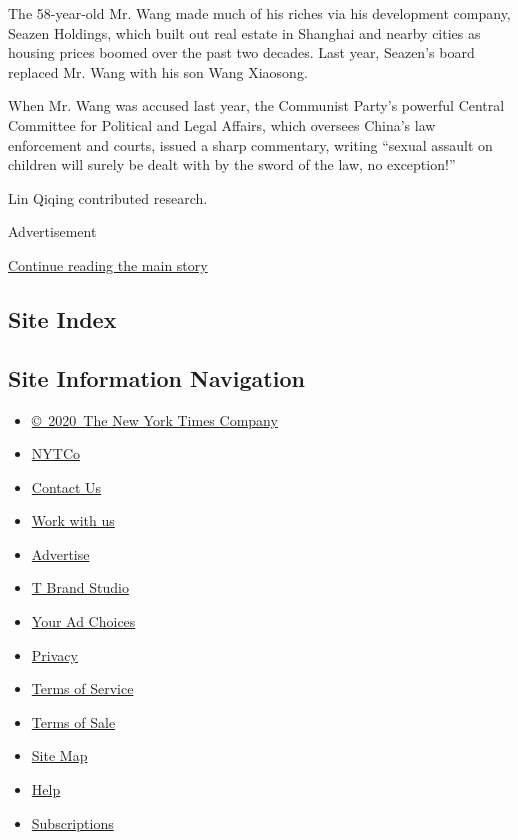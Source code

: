 The 58-year-old Mr. Wang made much of his riches via his development
company, Seazen Holdings, which built out real estate in Shanghai and
nearby cities as housing prices boomed over the past two decades. Last
year, Seazen's board replaced Mr. Wang with his son Wang Xiaosong.

When Mr. Wang was accused last year, the Communist Party's powerful
Central Committee for Political and Legal Affairs, which oversees
China's law enforcement and courts, issued a sharp commentary, writing
``sexual assault on children will surely be dealt with by the sword of
the law, no exception!''

Lin Qiqing contributed research.

Advertisement

\protect\hyperlink{after-bottom}{Continue reading the main story}

\hypertarget{site-index}{%
\subsection{Site Index}\label{site-index}}

\hypertarget{site-information-navigation}{%
\subsection{Site Information
Navigation}\label{site-information-navigation}}

\begin{itemize}
\tightlist
\item
  \href{https://help.nytimes.com/hc/en-us/articles/115014792127-Copyright-notice}{©~2020~The
  New York Times Company}
\end{itemize}

\begin{itemize}
\tightlist
\item
  \href{https://www.nytco.com/}{NYTCo}
\item
  \href{https://help.nytimes.com/hc/en-us/articles/115015385887-Contact-Us}{Contact
  Us}
\item
  \href{https://www.nytco.com/careers/}{Work with us}
\item
  \href{https://nytmediakit.com/}{Advertise}
\item
  \href{http://www.tbrandstudio.com/}{T Brand Studio}
\item
  \href{https://www.nytimes.com/privacy/cookie-policy\#how-do-i-manage-trackers}{Your
  Ad Choices}
\item
  \href{https://www.nytimes.com/privacy}{Privacy}
\item
  \href{https://help.nytimes.com/hc/en-us/articles/115014893428-Terms-of-service}{Terms
  of Service}
\item
  \href{https://help.nytimes.com/hc/en-us/articles/115014893968-Terms-of-sale}{Terms
  of Sale}
\item
  \href{https://spiderbites.nytimes.com}{Site Map}
\item
  \href{https://help.nytimes.com/hc/en-us}{Help}
\item
  \href{https://www.nytimes.com/subscription?campaignId=37WXW}{Subscriptions}
\end{itemize}
